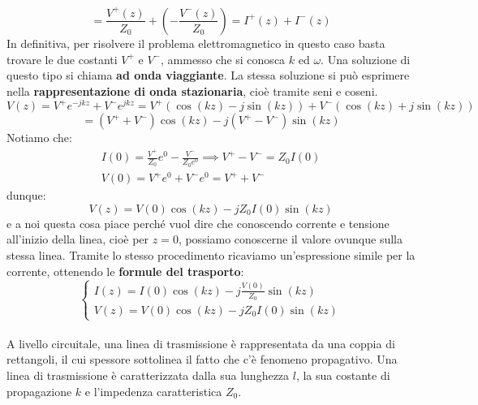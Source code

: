 \documentclass{book}
\begin{document}
        \begin{equation}
            = \frac{V^{+}(z)}{Z_{0}}+(-\frac{V^{-}(z)}{Z_{0}})=I^{+}(z)+I^{-}(z)
        \end{equation}
        In definitiva, per risolvere il problema elettromagnetico in questo caso basta trovare le due costanti  $V^{+}$ e $V^{-}$, ammesso che si conosca 
        $k$ ed $\omega$. Una soluzione di questo tipo si chiama \textbf{ad onda viaggiante}.
        La stessa soluzione si può esprimere nella \textbf{rappresentazione di onda stazionaria}, cioè tramite seni e coseni.
        \begin{equation}
            V(z)=V^{+}e^{-jkz}+V^{-}e^{jkz}=V^{+}(\cos(kz)-j\sin(kz))+V^{-}(\cos(kz)+j\sin(kz))
        \end{equation}
        \begin{equation}
            =(V^{+}+V^{-})\cos(kz)-j(V^{+}-V^{-})\sin(kz)
        \end{equation}
        Notiamo che:
        \begin{align}
            I(0)=\frac{V^{+}}{Z_{0}}e^{0}-\frac{V^{-}}{Z_{0}e^{0}} \implies V^{+}-V^{-}=Z_{0}I(0) \\
            V(0)=V^{+}e^{0}+V^{-}e^{0}=V^{+}+V^{-}
        \end{align}
        dunque:
        \begin{equation}
            V(z)=V(0)\cos(kz)-jZ_{0}I(0)\sin(kz)
        \end{equation}
        e a noi questa cosa piace perché vuol dire che conoscendo corrente e tensione all'inizio della linea, cioè per
        $z=0$, possiamo conoscerne il valore ovunque sulla stessa linea. Tramite lo 
        stesso procedimento ricaviamo un'espressione simile per la corrente, ottenendo le \textbf{formule del trasporto}:
        \begin{equation}
            \begin{cases}
                \displaystyle I(z) = I(0)\cos(kz)-j\frac{V(0)}{Z_{0}}\sin(kz) \\
                V(z) = V(0)\cos(kz)-jZ_{0}I(0)\sin(kz)
            \end{cases}
        \end{equation}
        \\ 
        A livello circuitale, una linea di trasmissione è rappresentata da una coppia di rettangoli, il cui 
        spessore sottolinea il fatto che c'è fenomeno propagativo. Una linea di trasmissione è caratterizzata dalla sua lunghezza $l$,
        la sua costante di propagazione $k$ e l'impedenza caratteristica $Z_{0}$. 
\end{document}
